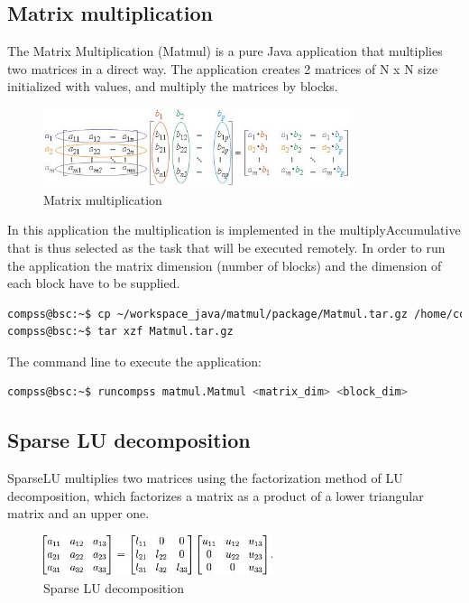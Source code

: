 \subsection{Matrix multiplication}
The Matrix Multiplication (Matmul) is a pure Java application that multiplies two matrices in a direct way. 
The application creates 2 matrices of N x N size initialized with values, and multiply the matrices by blocks.

\begin{figure}[ht!]
  \centering
    \includegraphics[width=0.8\textwidth]{./Sections/2_Java/Figures/matrix.jpeg}
    \caption{Matrix multiplication} 
    \label{fig:matrix}
\end{figure}

In this application the multiplication is implemented in the multiplyAccumulative that is thus selected 
as the task that will be executed remotely. In order to run the application the matrix dimension (number of blocks) and the dimension of each block
have to be supplied.

\begin{lstlisting}[language=bash]
compss@bsc:~$ cp ~/workspace_java/matmul/package/Matmul.tar.gz /home/compss/
compss@bsc:~$ tar xzf Matmul.tar.gz
\end{lstlisting}

The command line to execute the application:

\begin{lstlisting}[language=bash]
compss@bsc:~$ runcompss matmul.Matmul <matrix_dim> <block_dim>
\end{lstlisting}

\subsection{Sparse LU decomposition}
SparseLU multiplies two matrices using the factorization method of LU decomposition, which factorizes a 
matrix as a product of a lower triangular matrix and an upper one.

\begin{figure}[ht!]
  \centering
    \includegraphics[width=0.6\textwidth]{./Sections/2_Java/Figures/SparseLU.jpeg}
    \caption{Sparse LU decomposition}
    \label{fig:SparseLO}
\end{figure}


